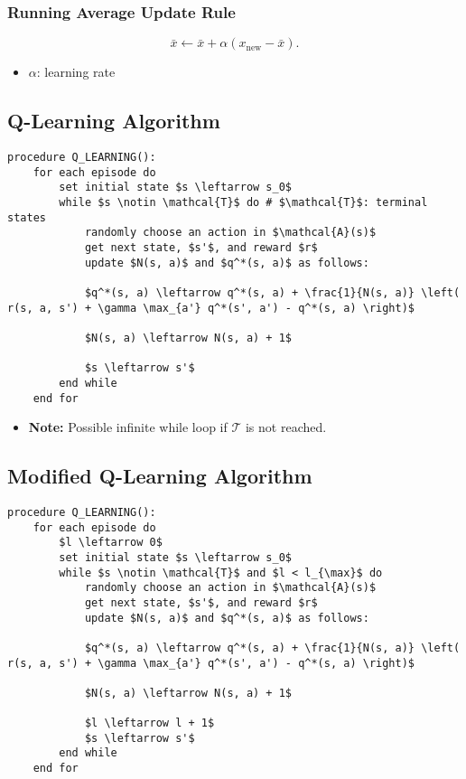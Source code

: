 \subsubsection{Running Average Update Rule}
\begin{definition}
    \begin{equation*}
        \bar{x} \gets \bar{x} + \alpha (x_{\text{new}} - \bar{x}).
    \end{equation*}
    \begin{itemize}
        \item $\alpha$: learning rate
    \end{itemize}
\end{definition}
\newpage

\subsection{Q-Learning Algorithm}
\begin{algo}
\begin{lstlisting}
procedure Q_LEARNING():
    for each episode do
        set initial state $s \leftarrow s_0$
        while $s \notin \mathcal{T}$ do # $\mathcal{T}$: terminal states
            randomly choose an action in $\mathcal{A}(s)$
            get next state, $s'$, and reward $r$
            update $N(s, a)$ and $q^*(s, a)$ as follows:

            $q^*(s, a) \leftarrow q^*(s, a) + \frac{1}{N(s, a)} \left( r(s, a, s') + \gamma \max_{a'} q^*(s', a') - q^*(s, a) \right)$
            
            $N(s, a) \leftarrow N(s, a) + 1$
            
            $s \leftarrow s'$
        end while
    end for
\end{lstlisting}
\begin{itemize}
    \item \textbf{Note:} Possible infinite while loop if $\mathcal{T}$ is not reached.
\end{itemize}
\end{algo}

\subsection{Modified Q-Learning Algorithm}
\begin{algo}
\begin{lstlisting}
procedure Q_LEARNING():
    for each episode do
        $l \leftarrow 0$
        set initial state $s \leftarrow s_0$
        while $s \notin \mathcal{T}$ and $l < l_{\max}$ do
            randomly choose an action in $\mathcal{A}(s)$
            get next state, $s'$, and reward $r$
            update $N(s, a)$ and $q^*(s, a)$ as follows:

            $q^*(s, a) \leftarrow q^*(s, a) + \frac{1}{N(s, a)} \left( r(s, a, s') + \gamma \max_{a'} q^*(s', a') - q^*(s, a) \right)$
            
            $N(s, a) \leftarrow N(s, a) + 1$
            
            $l \leftarrow l + 1$
            $s \leftarrow s'$
        end while
    end for
\end{lstlisting}        
\end{algo}

